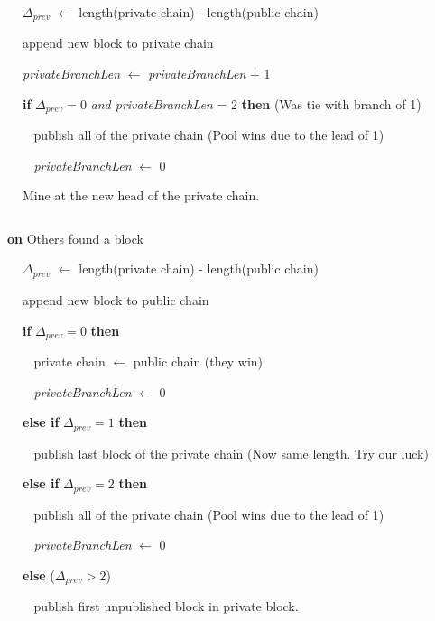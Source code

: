 \documentclass[a4paper, 11pt]{article}
\begin{document}
\begin{CJK*}{UTF8}{gbsn}
\begin{algorithm}
            $\ \ \ \ $ $\Delta_{\textit{prev}}$ $\leftarrow$ length(private chain) - length(public chain)

            $\ \ \ \ $ append new block to private chain

            $\ \ \ \ $ \textit{privateBranchLen} $\leftarrow$ \textit{privateBranchLen} + 1

            $\ \ \ \ $ \textbf{if} $\Delta_{\textit{prev}} = 0$ \textit{and privateBranchLen} = 2 \textbf{then} \hfill (Was tie with branch of 1)

                $\ \ \ \ \ \ \ \ $ publish all of the private chain \hfill (Pool wins due to the lead of 1)

                $\ \ \ \ \ \ \ \ $ \textit{privateBranchLen} $\leftarrow$ 0
            
            $\ \ \ \ $ Mine at the new head of the private chain.
        
        $ $

        \textbf{on} Others found a block 

            $\ \ \ \ $ $\Delta_{\textit{prev}}$ $\leftarrow$ length(private chain) - length(public chain)
            
            $\ \ \ \ $ append new block to public chain 

            $\ \ \ \ $ \textbf{if} $\Delta_{\textit{prev}} = 0$ \textbf{then}

                $\ \ \ \ \ \ \ \ $ private chain $\leftarrow$ public chain \hfill (they win)

                $\ \ \ \ \ \ \ \ $ \textit{privateBranchLen} $\leftarrow$ 0
            
            $\ \ \ \ $ \textbf{else if} $\Delta_{\textit{prev}} = 1 $ \textbf{then}

                $\ \ \ \ \ \ \ \ $ publish last block of the private chain \hfill (Now same length. Try our luck)

            $\ \ \ \ $ \textbf{else if} $\Delta_{\textit{prev}} = 2 $ \textbf{then}

                $\ \ \ \ \ \ \ \ $ publish all of the private chain \hfill (Pool wins due to the lead of 1)

                $\ \ \ \ \ \ \ \ $ \textit{privateBranchLen} $\leftarrow$ 0
            
            $\ \ \ \ $ \textbf{else} \hfill ($\Delta_{\textit{prev}} > 2$)

                $\ \ \ \ \ \ \ \ $ publish first unpublished block in private block.
            

\end{algorithm}
\end{CJK*}
\end{document}
